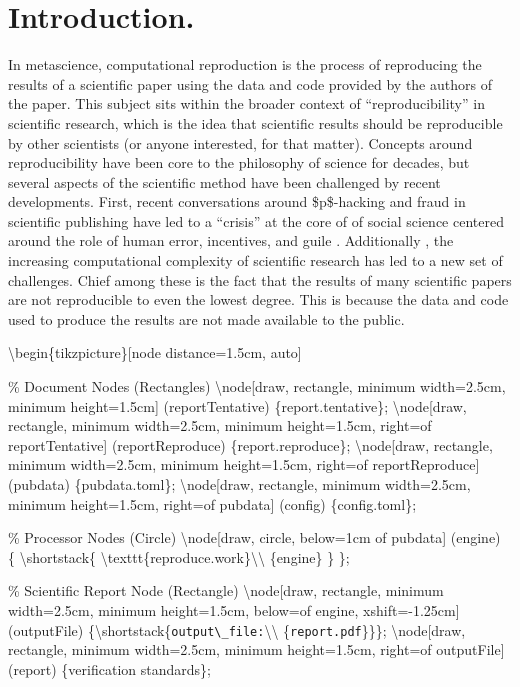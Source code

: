 
\hypertarget{introduction.}{%
\section{Introduction.}\label{introduction.}}

In metascience, computational reproduction is the process of reproducing the results of a scientific paper using the data and code provided by the authors of the paper. This subject sits within the broader context of ``reproducibility'' in scientific  research, which is the idea that scientific results should be reproducible by other scientists (or anyone interested, for that matter). Concepts around reproducibility have been core to the philosophy of science for decades, but several aspects of the scientific method have been challenged by recent developments. 
First, recent conversations around \$p\$-hacking and fraud in scientific publishing have led to a ``crisis'' at the core of of social science centered around the role of human error, incentives, and guile    . 
Additionally , the increasing computational complexity of scientific research has led to a new set of challenges. Chief among these is the fact that the results of many scientific papers are not reproducible to even the lowest degree. This is because the data and code used to produce the results are not made available to the public.


\textbackslash{}begin\{tikzpicture\}[node distance=1.5cm, auto]

\% Document Nodes (Rectangles)
\textbackslash{}node[draw, rectangle, minimum width=2.5cm, minimum height=1.5cm] (reportTentative) \{report.tentative\};
\textbackslash{}node[draw, rectangle, minimum width=2.5cm, minimum height=1.5cm, right=of reportTentative] (reportReproduce) \{report.reproduce\};
\textbackslash{}node[draw, rectangle, minimum width=2.5cm, minimum height=1.5cm, right=of reportReproduce] (pubdata) \{pubdata.toml\};
\textbackslash{}node[draw, rectangle, minimum width=2.5cm, minimum height=1.5cm, right=of pubdata] (config) \{config.toml\};

\% Processor Nodes (Circle)
\textbackslash{}node[draw, circle, below=1cm of pubdata] (engine) \{
\textbackslash{}shortstack\{
\textbackslash{}texttt\{reproduce.work\}\textbackslash{}\textbackslash{}
\{engine\}
\}
\};

\% Scientific Report Node (Rectangle)
\textbackslash{}node[draw, rectangle, minimum width=2.5cm, minimum height=1.5cm, below=of engine, xshift=-1.25cm] (outputFile) \{\textbackslash{}shortstack\{\texttt{output\textbackslash{}\_file:}\textbackslash{}\textbackslash{} \{\texttt{report.pdf}\}\}\};
\textbackslash{}node[draw, rectangle, minimum width=2.5cm, minimum height=1.5cm, right=of outputFile] (report) \{verification standards\};


